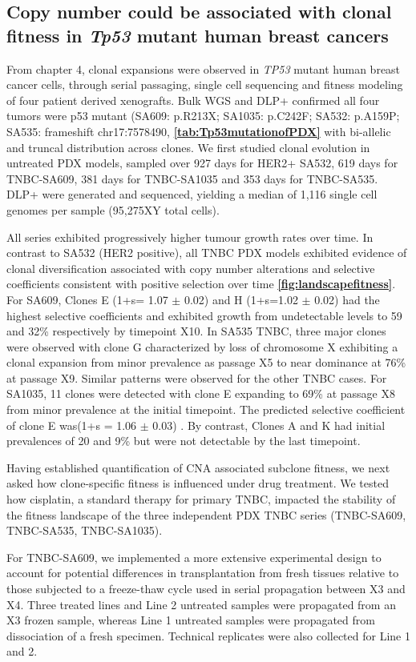 \subsection{Copy number could be associated with clonal fitness in \textit{Tp53} mutant human breast cancers}
From chapter 4, clonal expansions were observed in \textit{TP53} mutant human breast cancer cells, through serial passaging, single cell sequencing and fitness modeling of four patient derived xenografts. Bulk WGS and DLP+ confirmed all four tumors were p53 mutant (SA609: p.R213X; SA1035: p.C242F; SA532: p.A159P; SA535: frameshift chr17:7578490, \textbf{\autoref{tab:Tp53mutationofPDX}} with bi-allelic and truncal distribution across clones.
We first studied clonal evolution in untreated PDX models, sampled over 927 days for HER2+ SA532, 619 days for TNBC-SA609, 381 days for TNBC-SA1035 and 353 days for TNBC-SA535. DLP+ were generated and sequenced, yielding a median of 1,116 single cell genomes per sample (95,275XY total cells). 

All series exhibited progressively higher tumour growth rates over time. In contrast to SA532 (HER2 positive), all TNBC PDX models exhibited evidence of clonal diversification associated with copy number alterations and selective coefficients consistent with positive selection over time \textbf{\autoref{fig:landscapefitness}}. 
For SA609, Clones E  (1+s= 1.07 $\pm$ 0.02) and H (1+s=1.02 $\pm$ 0.02) had the highest selective coefficients and exhibited growth from undetectable levels to 59 and 32\% respectively by timepoint X10.
In SA535 TNBC, three major clones were observed with clone G characterized by loss of chromosome X exhibiting a clonal expansion from minor prevalence as passage X5 to near dominance at 76\% at passage X9.  Similar patterns were observed for the other TNBC cases.  
For SA1035, 11 clones were detected with clone E expanding to 69\% at passage X8 from minor prevalence at the initial timepoint.  The predicted selective coefficient of clone E was(1+s = 1.06 $\pm$ 0.03) . By contrast, Clones A and K had initial prevalences of 20 and 9\% but were not detectable by the last timepoint. 

Having established quantification of CNA associated subclone fitness, we next asked how clone-specific fitness is influenced under drug treatment. We tested how cisplatin, a standard therapy for primary TNBC,  impacted the stability of the fitness landscape of the three independent PDX TNBC series (TNBC-SA609, TNBC-SA535, TNBC-SA1035).

For TNBC-SA609, we implemented a more extensive experimental design to account for potential differences in transplantation from fresh tissues relative to those subjected to a freeze-thaw cycle used in serial propagation between X3 and X4. Three treated lines and Line 2 untreated samples were propagated from an X3 frozen sample, whereas Line 1 untreated samples were propagated from dissociation of a fresh specimen. Technical replicates were also collected for Line 1 and 2.    

